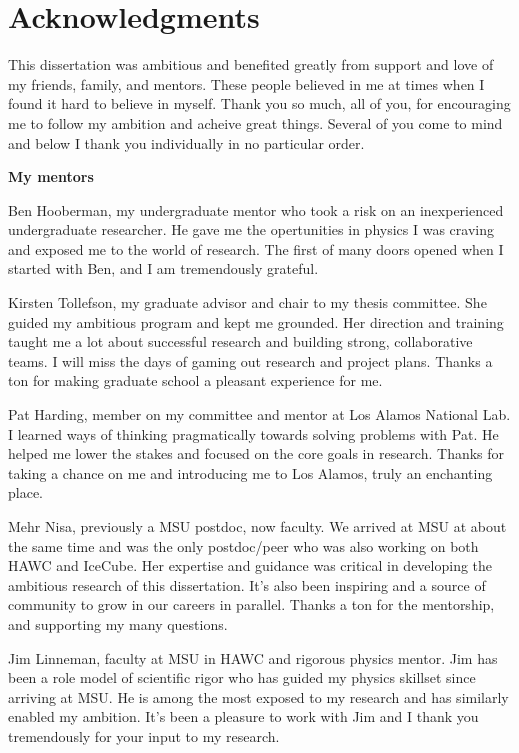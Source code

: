 \documentclass[PhD]{msu-thesis}
\begin{document}
\clearpage

\chapter*{Acknowledgments}
\DoubleSpacing

This dissertation was ambitious and benefited greatly from support and love of my friends, family, and mentors.
These people believed in me at times when I found it hard to believe in myself.
Thank you so much, all of you, for encouraging me to follow my ambition and acheive great things.
Several of you come to mind and below I thank you individually in no particular order.

\textbf{My mentors}

Ben Hooberman, my undergraduate mentor who took a risk on an inexperienced undergraduate researcher.
He gave me the opertunities in physics I was craving and exposed me to the world of research.
The first of many doors opened when I started with Ben, and I am tremendously grateful.

Kirsten Tollefson, my graduate advisor and chair to my thesis committee.
She guided my ambitious program and kept me grounded.
Her direction and training taught me a lot about successful research and building strong, collaborative teams.
I will miss the days of gaming out research and project plans.
Thanks a ton for making graduate school a pleasant experience for me.

Pat Harding, member on my committee and mentor at Los Alamos National Lab.
I learned ways of thinking pragmatically towards solving problems with Pat.
He helped me lower the stakes and focused on the core goals in research.
Thanks for taking a chance on me and introducing me to Los Alamos, truly an enchanting place.

Mehr Nisa, previously a MSU postdoc, now faculty.
We arrived at MSU at about the same time and was the only postdoc/peer who was also working on both HAWC and IceCube.
Her expertise and guidance was critical in developing the ambitious research of this dissertation.
It's also been inspiring and a source of community to grow in our careers in parallel.
Thanks a ton for the mentorship, and supporting my many questions.

Jim Linneman, faculty at MSU in HAWC and rigorous physics mentor.
Jim has been a role model of scientific rigor who has guided my physics skillset since arriving at MSU.
He is among the most exposed to my research and has similarly enabled my ambition.
It's been a pleasure to work with Jim and I thank you tremendously for your input to my research.
\end{document}
